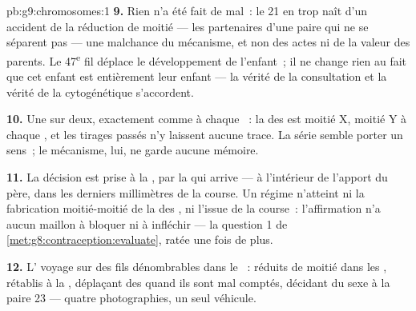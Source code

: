 \begin{solution}{pb:g9:chromosomes:1}
\textbf{9.} Rien n'a été fait de mal~: le 21 en trop naît
d'un accident de la réduction de moitié --- les partenaires
d'une paire qui ne se séparent pas --- une malchance du
mécanisme, et non des actes ni de la valeur des parents. Le
47\textsuperscript{e} fil déplace le développement de l'enfant~; il ne
change rien au fait que cet enfant est entièrement leur
enfant --- la vérité de la consultation et la vérité de la
cytogénétique s'accordent.

\textbf{10.} Une sur deux, exactement comme à chaque
~: la  des  est moitié X,
moitié Y à chaque , et les tirages passés n'y
laissent aucune trace. La série semble porter un sens~; le
mécanisme, lui, ne garde aucune mémoire.

\textbf{11.} La décision est prise à la , par la
 qui arrive --- à l'intérieur de l'apport du
père, dans les derniers millimètres de la course. Un régime
n'atteint ni la fabrication moitié-moitié de la 
des , ni l'issue de la course~: l'affirmation
n'a aucun maillon à bloquer ni à infléchir --- la question 1
de \cref{met:g8:contraception:evaluate}, ratée une fois de
plus.

\textbf{12.} L' voyage sur des fils dénombrables
dans le ~: réduits de moitié dans les ,
rétablis à la , déplaçant des  quand
ils sont mal comptés, décidant du sexe à la paire 23 ---
quatre photographies, un seul véhicule.
\end{solution}
